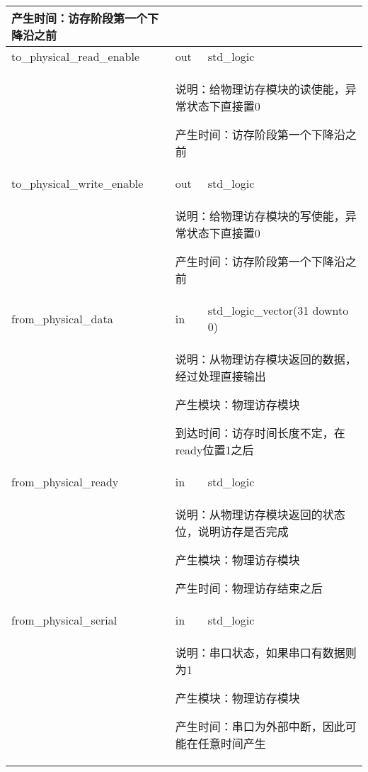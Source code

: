 \begin{tabularx}{\textwidth}{lll}
{                产生时间：访存阶段第一个下降沿之前
            } \\
            \midrule
            to\_physical\_read\_enable      & out       & std\_logic \\
            \cmidrule(l){2-3}
            &
            \multicolumn{2}{X}{
                说明：给物理访存模块的读使能，异常状态下直接置0

                产生时间：访存阶段第一个下降沿之前
            } \\
            \midrule
            to\_physical\_write\_enable      & out       & std\_logic \\
            \cmidrule(l){2-3}
            &
            \multicolumn{2}{X}{
                说明：给物理访存模块的写使能，异常状态下直接置0

                产生时间：访存阶段第一个下降沿之前
            } \\
            \midrule
            from\_physical\_data      & in       & std\_logic\_vector(31 downto 0) \\
            \cmidrule(l){2-3}
            &
            \multicolumn{2}{X}{
                说明：从物理访存模块返回的数据，经过处理直接输出

                产生模块：物理访存模块

                到达时间：访存时间长度不定，在ready位置1之后
            } \\
            \midrule
            from\_physical\_ready     & in       & std\_logic \\
            \cmidrule(l){2-3}
            &
            \multicolumn{2}{X}{
                说明：从物理访存模块返回的状态位，说明访存是否完成

                产生模块：物理访存模块

                产生时间：物理访存结束之后
            } \\
            \midrule
            from\_physical\_serial      & in       & std\_logic \\
            \cmidrule(l){2-3}
            &
            \multicolumn{2}{X}{
                说明：串口状态，如果串口有数据则为1

                产生模块：物理访存模块

                产生时间：串口为外部中断，因此可能在任意时间产生
            } \\
            \bottomrule
        \end{tabularx}
